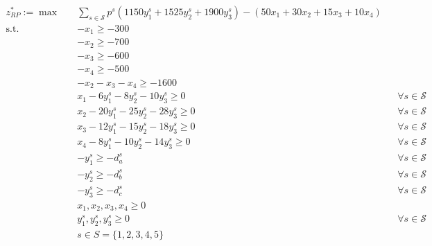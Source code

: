 \documentclass[7pt]{article}
\begin{document}
\begin{align*}
    z_{RP}^* := \max \quad
     & \sum_{s \in \mathcal{S}} p^s \left(1150y_1^s + 1525y_2^s + 1900 y_3^s \right)
    - \left(50 x_1 + 30 x_2 + 15 x_3 + 10 x_4 \right)                                                               \\
    \text{s.t.} \quad
     & -x_1 \geq -300                                                                                               \\
     & -x_2 \geq -700                                                                                               \\
     & -x_3 \geq -600                                                                                               \\
     & -x_4 \geq -500                                                                                               \\
     & -x_2 - x_3 - x_4 \geq -1600                                                                                  \\
     & x_1 - 6 y_1^s - 8 y_2^s - 10 y_3^s \geq 0 \quad                               &  & \forall s \in \mathcal{S} \\
     & x_2 - 20 y_1^s - 25 y_2^s - 28 y_3^s \geq 0 \quad                             &  & \forall s \in \mathcal{S} \\
     & x_3 - 12 y_1^s - 15 y_2^s - 18 y_3^s \geq 0 \quad                             &  & \forall s \in \mathcal{S} \\
     & x_4 - 8 y_1^s - 10 y_2^s - 14 y_3^s \geq 0 \quad                              &  & \forall s \in \mathcal{S} \\
     & -y_1^s \geq -d_a^s                                                            &  & \forall s \in \mathcal{S} \\
     & -y_2^s \geq -d_b^s                                                            &  & \forall s \in \mathcal{S} \\
     & -y_3^s \geq -d_c^s                                                            &  & \forall s \in \mathcal{S} \\
     & x_1, x_2, x_3, x_4 \geq 0                                                                                    \\
     & y_1^s, y_2^s, y_3^s \geq 0 \quad                                              &  & \forall s \in \mathcal{S} \\
     & s \in S = \{1,2,3,4,5\}
\end{align*}
\end{document}
